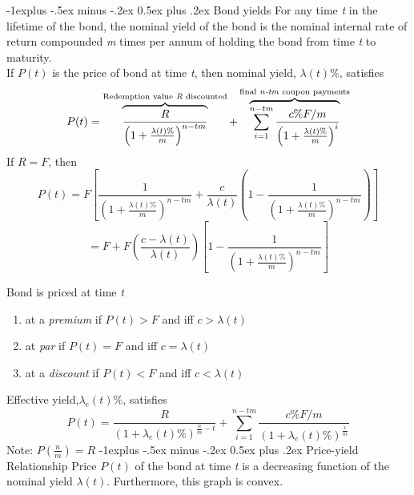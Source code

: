 \documentclass[10pt,landscape]{article}
\makeatletter
\renewcommand{\subsection}{\@startsection{subsection}{2}{0mm}%
                                {-1explus -.5ex minus -.2ex}%
                                {0.5ex plus .2ex}%
                                {\normalfont\normalsize\bfseries}}
\makeatother
\begin{document}
\begin{multicols}{3}
\subsection{Bond yields}
For any time \emph{t} in the lifetime of the bond, the nominal yield of the bond is the nominal internal rate of return compounded \emph{m} times per annum of holding the bond from time \emph{t} to maturity.\\
If $P(t)$ is the price of bond at time \emph{t}, then nominal yield, $\lambda(t)\%$, satisfies
\[P(t)=\overbrace{\frac{R}{\left(1+\frac{\lambda(t)\%}{m}\right)^{n-tm}}}^\text{Redemption value \emph{R} discounted}+\overbrace{ \displaystyle\sum_{i=1}^{n-tm}\frac{c\%F/m}{\left(1+\frac{\lambda(t)\%}{m}\right)^i}}^\text{final \emph{n-tm} coupon payments}\]
If $R=F$, then
\[P(t)=F\left[\frac{1}{\left(1+\frac{\lambda(t)\%}{m}\right)^{n-tm}}+\frac{c}{\lambda(t)}\left(1-\frac{1}{\left(1+\frac{\lambda(t)\%}{m}\right)^{n-tm}}\right)\right]\]
\[=F+F\left(\frac{c-\lambda(t)}{\lambda(t)}\right)\left[1-\frac{1}{\left(1+\frac{\lambda(t)\%}{m}\right)^{n-tm}}\right]\]

Bond is priced at time \emph{t}
\begin{enumerate}
    \item at a \emph{premium} if $P(t)>F$ and iff $c>\lambda(t)$
    \item at \emph{par} if $P(t)=F$ and iff $c=\lambda(t)$
    \item at a \emph{discount} if $P(t)<F$ and iff $c<\lambda(t)$
\end{enumerate}
Effective yield,$\lambda_e(t)\%$, satisfies
\[P(t)=\frac{R}{(1+\lambda_e(t)\%)^{\frac{n}{m}-t}}+\sum_{i=1}^{n-tm}\frac{c\%F/m}{(1+\lambda_e(t)\%)^{\frac{i}{m}}}\]
Note: $P(\frac{n}{m})=R$
\subsection{Price-yield Relationship}
Price $P(t)$ of the bond at time \emph{t} is a decreasing function of the nominal yield $\lambda(t)$. Furthermore, this graph is convex.\\

\end{multicols}
\end{document}
